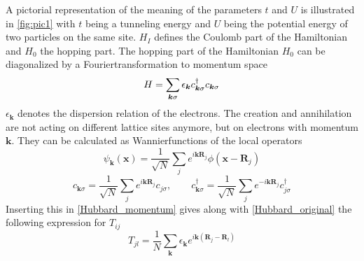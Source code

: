 A pictorial representation of the meaning of the parameters $ t $ and $ U $ is illustrated in \ref{fig:pic1} with $t$ being a tunneling energy and $U$ being the potential energy of two particles on the same site. 
$ H_I $ defines the Coulomb part of the Hamiltonian and $H_0$ the hopping part.
The hopping part of the Hamiltonian $H_0$ can be diagonalized by a Fouriertransformation to momentum space 
\begin{equation}\label{Hubbard_momentum}
H = \sum_{\boldsymbol{k} \sigma} \epsilon_{\boldsymbol{k}} c_{\boldsymbol{k}\sigma}^\dag c_{\boldsymbol{k}\sigma}\\
\end{equation}
$ \epsilon_{\boldsymbol{k}} $ denotes the dispersion relation of the electrons. The creation and annihilation are not acting on different lattice sites anymore, but on electrons with momentum $ \boldsymbol{k} $. They can be calculated as Wannierfunctions of the local operators
\begin{equation}\label{Wannier}
\psi_{\boldsymbol{k}} \left( \boldsymbol{x}\right) = \frac{1}{\sqrt{N}}\sum_{j} e^{i\boldsymbol{k}\boldsymbol{R}_j} \phi(\boldsymbol{x}-\boldsymbol{R}_j)
\end{equation} 
\begin{equation}\label{c_momentum}
c_{\boldsymbol{k}\sigma} = \frac{1}{\sqrt{N}}\sum_{j} e^{i\boldsymbol{k}\boldsymbol{R}_j} c_{j\sigma}, \qquad c_{\boldsymbol{k}\sigma}^\dagger = \frac{1}{\sqrt{N}}\sum_{j} e^{-i\boldsymbol{k}\boldsymbol{R}_j} c_{j\sigma}^\dagger
\end{equation}  
Inserting this in \eqref{Hubbard_momentum} gives along with \eqref{Hubbard_original} the following expression for $ T_{ij} $ 
\begin{equation}\label{T}
T_{jl} = \frac{1}{N} \sum_{\boldsymbol{k}}\epsilon_{\boldsymbol{k}} e^{i\boldsymbol{k}\left( \boldsymbol{R}_j - \boldsymbol{R}_l\right) }
\end{equation}

